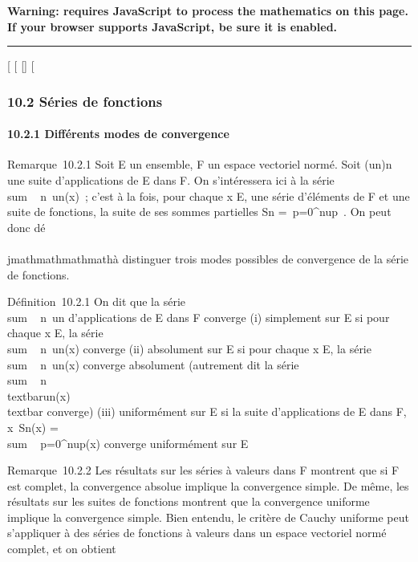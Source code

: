 \textbf{Warning: 
requires JavaScript to process the mathematics on this page.\\ If your
browser supports JavaScript, be sure it is enabled.}

\begin{center}\rule{3in}{0.4pt}\end{center}

{[}
{[}
{[}{]}
{[}

\subsubsection{10.2 Séries de fonctions}

\paragraph{10.2.1 Différents modes de convergence}

Remarque~10.2.1 Soit E un ensemble, F un espace vectoriel normé. Soit
(un)n\in{}~ une suite d'applications de E dans F. On
s'intéressera ici à la série
\\sum ~
n\in{}~un(x)~; c'est à la fois, pour chaque x \in E, une
série d'éléments de F et une suite de fonctions, la suite de ses sommes
partielles Sn =\
\sum  p=0^nup~. On peut
donc dé\\\\jmathmathmathmathà distinguer trois modes possibles de convergence de la série de
fonctions.

Définition~10.2.1 On dit que la série
\\sum ~
n\in{}~un d'applications de E dans F converge (i)
simplement sur E si pour chaque x \in E, la série
\\sum ~
n\in{}~un(x) converge (ii) absolument sur E si pour chaque
x \in E, la série \\sum ~
n\in{}~un(x) converge absolument (autrement dit la série
\\sum ~
n\in{}~\\textbar{}un(x)\\textbar{}
converge) (iii) uniformément sur E si la suite d'applications de E dans
F, x\mapsto~Sn(x)
= \\sum ~
p=0^nup(x) converge uniformément sur E

Remarque~10.2.2 Les résultats sur les séries à valeurs dans F montrent
que si F est complet, la convergence absolue implique la convergence
simple. De même, les résultats sur les suites de fonctions montrent que
la convergence uniforme implique la convergence simple. Bien entendu, le
critère de Cauchy uniforme peut s'appliquer à des séries de fonctions à
valeurs dans un espace vectoriel normé complet, et on obtient

